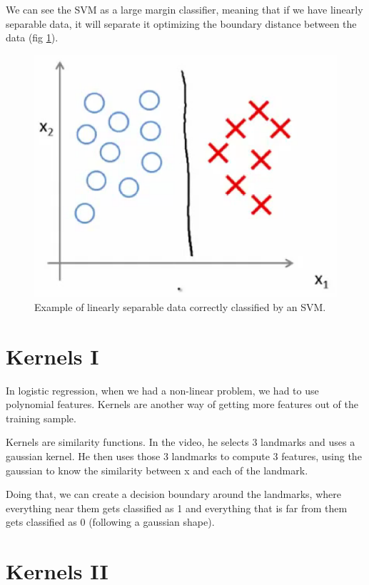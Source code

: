 \documentclass[10pt]{extarticle}
\begin{document}
We can see the SVM as a large margin classifier, meaning that if we have
linearly separable data, it will separate it optimizing the boundary
distance between the data (fig \ref{fig:large_margin}).

\begin{figure}
\centering
\includegraphics[width=\textwidth]{img/large_margin.eps}
\caption{Example of linearly separable data correctly classified by an SVM.}
\label{fig:large_margin}
\end{figure}

\section{Kernels I}\label{kernels-i}

In logistic regression, when we had a non-linear problem, we had to use
polynomial features. Kernels are another way of getting more features
out of the training sample. \smallskip

Kernels are similarity functions. In the video, he selects 3 landmarks
and uses a gaussian kernel. He then uses those 3 landmarks to compute 3
features, using the gaussian to know the similarity between x and each
of the landmark.

Doing that, we can create a decision boundary around the landmarks,
where everything near them gets classified as 1 and everything that is
far from them gets classified as 0 (following a gaussian shape).

\section{Kernels II}\label{kernels-ii}
\end{document}
